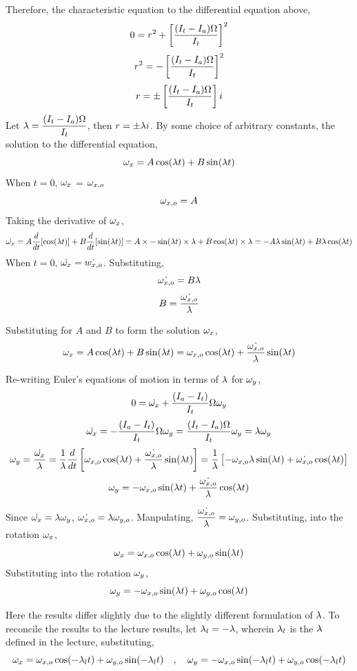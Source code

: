 \documentclass[a4paper, 12pt]{report}
\begin{document}
\begin{center}
Therefore, the characteristic equation to the differential equation above,
$$0 = r^2 + \left[\frac{(I_{t}-I_{a})\Omega}{I_{t}}\right]^2$$
$$r^2 =  - \left[\frac{(I_{t}-I_{a})\Omega}{I_{t}}\right]^2$$
$$r =  \pm \left[\frac{(I_{t}-I_{a})\Omega}{I_{t}}\right]i$$
Let $\displaystyle{\lambda= \frac{(I_{t}-I_{a})\Omega}{I_{t}}}$, then $r = \pm\lambda i$. By some choice of arbitrary constants, the solution to the differential equation,
$$\omega_x = A\cos(\lambda t) + B\sin(\lambda t)$$
When $t=0$, $\omega_x$ = $\omega_{x,o}$
$$\omega_{x,o} = A$$
Taking the derivative of $\omega_x$,
$$\dot{\omega_x} = A\frac{d}{dt}[\cos(\lambda t)] + B\frac{d}{dt}[\sin(\lambda t)] = A\times-\sin(\lambda t)\times \lambda + B\cos(\lambda t)\times \lambda = -A\lambda\sin(\lambda t)  + B\lambda\cos(\lambda t)$$
When $t=0$, $\dot{\omega_x} = \dot{w_{x,o}}$. Substituting,
$$\dot{\omega_{x,o}} = B\lambda$$
$$B = \frac{\dot{\omega_{x,o}}}{\lambda}$$

Substituting for $A$ and $B$ to form the solution $\omega_x$,
$$\omega_x = A\cos(\lambda t) + B\sin(\lambda t) = \omega_{x,o}\cos(\lambda t) + \frac{\dot{\omega_{x,o}}}{\lambda}\sin(\lambda t)$$

Re-writing Euler's equations of motion in terms of $\lambda$ for $\omega_y$,
$$0 = \dot{\omega_x} + \frac{(I_{a} - I_{t})}{I_{t}}\Omega\omega_y$$
$$\dot{\omega_x} =  - \frac{(I_{a} - I_{t})}{I_{t}}\Omega\omega_y = \frac{(I_{t} - I_{a})\Omega}{I_{t}}\omega_y = \lambda\omega_y$$
$$\omega_y = \frac{\dot{\omega_x}}{\lambda} = \frac{1}{\lambda}\frac{d}{dt}\left[\omega_{x,o}\cos(\lambda t) + \frac{\dot{\omega_{x,o}}}{\lambda}\sin(\lambda t)\right] = \frac{1}{\lambda}\left[-\omega_{x,o}\lambda\sin(\lambda t) + \dot{\omega_{x,o}}\cos(\lambda t)\right]$$
$$\omega_y = -\omega_{x,o}\sin(\lambda t) + \frac{\dot{\omega_{x,o}}}{\lambda}\cos(\lambda t)$$

Since $\displaystyle{\dot{\omega_x} = \lambda\omega_y}$, $\displaystyle{\dot{\omega_{x,o}} = \lambda\omega_{y,o}}$. Manpulating, $\displaystyle{\frac{\dot{\omega_{x,o}}}{\lambda} = \omega_{y,o}}$. Substituting, into the rotation $\omega_x$,
$$\omega_x = \omega_{x,o}\cos(\lambda t) + \omega_{y,o}\sin(\lambda t)$$
Substituting into the rotation $\omega_y$,
$$\omega_y = -\omega_{x,o}\sin(\lambda t) + \omega_{y,o}\cos(\lambda t)$$

Here the results differ slightly due to the slightly different formulation of $\lambda$. To reconcile the results to the lecture results, let $\lambda_l = -\lambda$, wherein $\lambda_l$ is the $\lambda$ defined in the lecture, substituting,
$$\omega_x = \omega_{x,o}\cos(-\lambda_l t) + \omega_{y,o}\sin(-\lambda_l t) \quad,\quad \omega_y = -\omega_{x,o}\sin(-\lambda_l t) + \omega_{y,o}\cos(-\lambda_l t)$$
\\~\\



\end{center}
\end{document}

